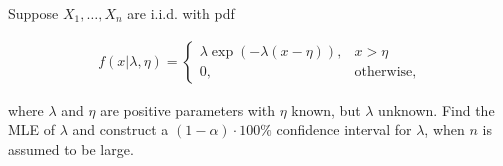 
\begin{exercise}

\phantom{}

\end{exercise}


\begin{solution}

\phantom{}

\end{solution}


\begin{exercise}

Suppose $X_1,\dots,X_n$ are i.i.d. with pdf

\begin{align*}
  f(x | \lambda, \eta) = \begin{cases}
    \lambda \exp(-\lambda (x - \eta)), & x > \eta \\
    0, & \text{otherwise},
  \end{cases}
\end{align*}

where $\lambda$ and $\eta$ are positive parameters with $\eta$ known,
but $\lambda$ unknown. Find the MLE of $\lambda$ and construct a
$(1 - \alpha)\cdot 100\%$ confidence interval for $\lambda$, when $n$
is assumed to be large.

\end{exercise}


\begin{solution}

\phantom{}

\end{solution}

